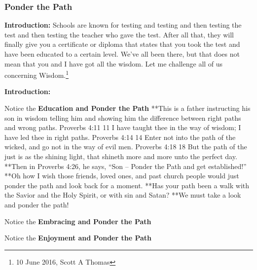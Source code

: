 

\subsubsection{Ponder the Path}
\textbf{Introduction: }Schools are known for testing and testing and then testing the test and then testing the teacher who gave the test. After all that, they will finally give you a certificate or diploma that states that you took the test and have been educated to a certain level. We’ve all been there, but that does not mean that you and I have got all the wisdom. Let me challenge all of us concerning Wisdom.\footnote{10 June 2016, Scott A Thomas}

\textbf{Introduction: }
\begin{compactenum}
	\item Notice the \textbf{Education and Ponder the Path}
**This is a father instructing his son in wisdom telling him and showing him the difference between right paths and wrong paths. 
Proverbs 4:11  11 I have taught thee in the way of wisdom; I have led thee in right paths.
Proverbs 4:14  14 Enter not into the path of the wicked, and go not in the way of evil men.
Proverbs 4:18  18 But the path of the just is as the shining light, that shineth more and more unto the perfect day.
**Then in Proverbs 4:26, he says, “Son – Ponder the Path and get established!”
**Oh how I wish those friends, loved ones, and past church people would just ponder the path and look back for a moment.  
**Has your path been a walk with the Savior and the Holy Spirit, or with sin and Satan?
**We must take a look and ponder the path!
	\item Notice the \textbf{Embracing  and Ponder the Path}
	\item Notice the \textbf{Enjoyment   and Ponder the Path}
\end{compactenum}



